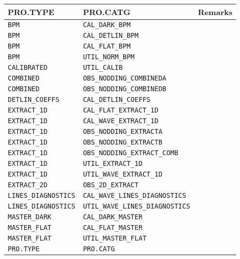 \begin{tabular}{|l|l|l|}
    \hline
    \textbf{PRO.TYPE} &
    \textbf{PRO.CATG} &
    \textbf{Remarks} \\
    \hline
\texttt{BPM              } & \texttt{CAL\_DARK\_BPM}                & \\
\texttt{BPM              } & \texttt{CAL\_DETLIN\_BPM}              & \\
\texttt{BPM              } & \texttt{CAL\_FLAT\_BPM}                & \\
\texttt{BPM              } & \texttt{UTIL\_NORM\_BPM}               & \\
\texttt{CALIBRATED       } & \texttt{UTIL\_CALIB}                  & \\
\texttt{COMBINED         } & \texttt{OBS\_NODDING\_COMBINEDA}       & \\
\texttt{COMBINED         } & \texttt{OBS\_NODDING\_COMBINEDB}       & \\
\texttt{DETLIN\_COEFFS    } & \texttt{CAL\_DETLIN\_COEFFS}           & \\
\texttt{EXTRACT\_1D       } & \texttt{CAL\_FLAT\_EXTRACT\_1D}         & \\
\texttt{EXTRACT\_1D       } & \texttt{CAL\_WAVE\_EXTRACT\_1D}         & \\
\texttt{EXTRACT\_1D       } & \texttt{OBS\_NODDING\_EXTRACTA}        & \\
\texttt{EXTRACT\_1D       } & \texttt{OBS\_NODDING\_EXTRACTB}        & \\
\texttt{EXTRACT\_1D       } & \texttt{OBS\_NODDING\_EXTRACT\_COMB}    & \\
\texttt{EXTRACT\_1D       } & \texttt{UTIL\_EXTRACT\_1D}             & \\
\texttt{EXTRACT\_1D       } & \texttt{UTIL\_WAVE\_EXTRACT\_1D}        & \\
\texttt{EXTRACT\_2D       } & \texttt{OBS\_2D\_EXTRACT}        & \\
\texttt{LINES\_DIAGNOSTICS} & \texttt{CAL\_WAVE\_LINES\_DIAGNOSTICS}  & \\
\texttt{LINES\_DIAGNOSTICS} & \texttt{UTIL\_WAVE\_LINES\_DIAGNOSTICS} & \\
\texttt{MASTER\_DARK      } & \texttt{CAL\_DARK\_MASTER}             & \\
\texttt{MASTER\_FLAT      } & \texttt{CAL\_FLAT\_MASTER}             & \\
\texttt{MASTER\_FLAT      } & \texttt{UTIL\_MASTER\_FLAT}            & \\
\texttt{PRO.TYPE         } & \texttt{PRO.CATG}                    & \\

\end{tabular}
